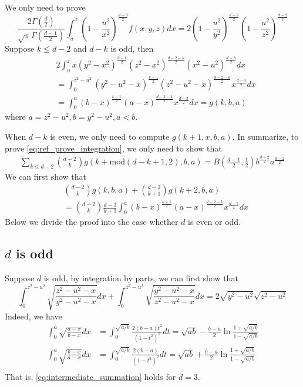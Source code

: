 \documentclass{article}
\begin{document}
We only need to prove
\begin{equation}\label{eq:ref_prove_integration}    
    \frac{2\Gamma(\frac{d}{2})}
    {\sqrt{\pi}\Gamma(\frac{d-1}{2})}
    \int_u^z (1-\frac{u^2}{x^2})^{\frac{d-3}{2}}
    f(x,y,z)dx =
    2(1-\frac{u^2}{y^2})^{\frac{d-2}{2}}
    (1-\frac{u^2}{z^2})^{\frac{d-2}{2}}
\end{equation} 
Suppose $k\leq d-2$ and $d-k$ is odd,
then
\begin{align*}
    &2\int_u^z x
    (y^2-x^2)^{\frac{k-1}{2}}
    (z^2-x^2)^{\frac{d-2-k}{2}}
    (x^2-u^2)^{\frac{d-3}{2}}dx\\
    &=\int_{0}^{z^2-u^2}
    (y^2-u^2-x)^{\frac{k-1}{2}}
    (z^2-u^2-x)^{\frac{d-2-k}{2}}
    x^{\frac{d-3}{2}}dx\\
    &=\int_{0}^{a}
    (b-x)^{\frac{k-1}{2}}
    (a-x)^{\frac{d-2-k}{2}}
    x^{\frac{d-3}{2}}dx=g(k,b,a)
\end{align*}
where $a=z^2-u^2, b=y^2-u^2, a<b$.

When $d-k$ is even, we only need to compute
$g(k+1,x,b,a)$.
In summarize, to prove \eqref{eq:ref_prove_integration},
we only need to show that
\begin{align}\label{eq:intermediate_summation}
    \sum_{k\leq d-2}\binom{d-2}{k}g(k+\textrm{mod}(d-k+1,2)
    ,b,a)
    = B(\frac{d-1}{2}, \frac{1}{2})
    b^{\frac{d-2}{2}}
    a^{\frac{d-2}{2}}
\end{align}
We can first show that
\begin{align*}
    &\binom{d-2}{k}
    g(k,b,a) + \binom{d-2}{k+1}
    g(k+2,b,a) \\
    &=\binom{d-2}{k}\frac{d-3}{k+1}
    \int_{0}^{a}
    (b-x)^{\frac{k+1}{2}}
    (a-x)^{\frac{d-2-k}{2}}
    x^{\frac{d-5}{2}}dx
\end{align*}
Below we divide the proof into the case whether
$d$ is even or odd.

\subsection{$d$ is odd}
Suppose $d$ is odd, by integration by parts, we can first show that
\begin{equation}
    \int_0^{z^2-u^2} \sqrt{\frac{z^2-u^2-x}{y^2-u^2-x}}dx
    + \int_0^{z^2-u^2} \sqrt{\frac{y^2-u^2-x}{z^2-u^2-x}}dx
    = 2\sqrt{y^2-u^2}\sqrt{z^2-u^2}
\end{equation}
Indeed, we have
\begin{align}
    \int_0^a \sqrt{\frac{a-x}{b-x}}dx
    &= \int_0^{\sqrt{a/b}} \frac{2(b-a)t^2}{(1-t^2)^2}dt
    =\sqrt{ab} - \frac{b-a}{2}\ln \frac{1+\sqrt{a/b}}{1-\sqrt{a/b}} \\
    \int_0^a \sqrt{\frac{b-x}{a-x}}dx
    &= \int_0^{\sqrt{a/b}} \frac{2(b-a)}{(1-t^2)^2}dt
    =\sqrt{ab} + \frac{b-a}{2}\ln \frac{1+\sqrt{a/b}}{1-\sqrt{a/b}} \\
\end{align}
That is, \eqref{eq:intermediate_summation} holds for $d=3$.
\end{document}
